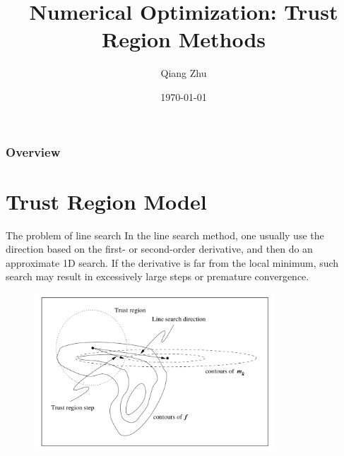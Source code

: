 \documentclass{beamer}
\title[Trust Region Methods]{Numerical Optimization: Trust Region Methods} %
\author{Qiang Zhu} %
\institute[University of Nevada Las Vegas] %
{
University of Nevada Las Vegas\\ %
\medskip
}
\date{\today} %
\begin{document}
\begin{frame}
\titlepage %
\end{frame}

\begin{frame}
\frametitle{Overview} %
\tableofcontents %
\end{frame}



\section{Trust Region Model}
\begin{frame}{The problem of line search}
In the line search method, one usually use the direction based on the first- or second-order derivative, and then do an approximate 1D search. 
If the derivative is far from the local minimum, such search may result in excessively large steps or premature convergence.

\begin{figure}
\centering
\includegraphics[width=90mm]{Lecture_notes/Figs/trust-region.jpeg}
\end{figure}
\end{frame}
\end{document}

